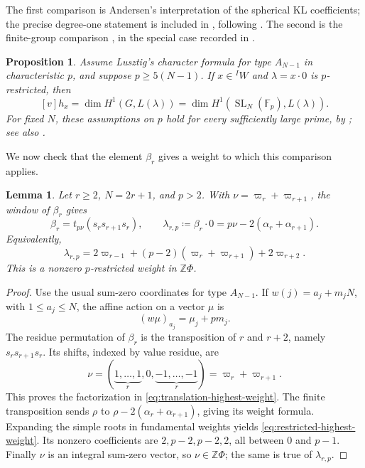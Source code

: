 \documentclass[11pt,a4paper,reqno]{amsart}
\numberwithin{equation}{section}
\newtheorem{proposition}[theorem]{Proposition}
\newtheorem{lemma}[theorem]{Lemma}
\theoremstyle{definition}
\theoremstyle{remark}
\theoremstyle{plain}
\begin{document}
The first comparison is Andersen's interpretation of the spherical
KL coefficients; the precise degree-one statement is included in
\cite[Theorem~4.5]{Luebeck}, following \cite{Andersen}.
The second is the finite-group comparison
\cite[Theorem~7.5]{BNPcompare}, in the special case recorded in
\cite[Theorem~4.6]{Luebeck}.

\begin{proposition}
\label{prop:cohomology-input}
Assume Lusztig's character formula for type $A_{N-1}$ in
characteristic $p$, and suppose $p\geq5(N-1)$.
If $x\in{}^I W$ and $\lambda=x\cdot0$ is $p$-restricted, then
\begin{equation}\label{eq:cohomology-comparison}
 [v]h_x
 =\dim H^1(G,L(\lambda))
 =\dim H^1(\operatorname{SL}_N(\mathbb F_p),L(\lambda)).
\end{equation}
For fixed $N$, these assumptions on $p$ hold for every sufficiently
large prime, by \cite{AJS,Fiebig}; see also
\cite[Theorem~3.1]{Luebeck}.
\end{proposition}

We now check that the element $\beta_r$ gives a weight to which this
comparison applies.

\begin{lemma}\label{lem:highest-weight}
Let $r\geq2$, $N=2r+1$, and $p>2$.
With $\nu=\varpi_r+\varpi_{r+1}$, the window of $\beta_r$ gives
\begin{equation}\label{eq:translation-highest-weight}
 \beta_r=t_{p\nu}(s_rs_{r+1}s_r),\qquad
 \lambda_{r,p}  \coloneqq  \beta_r\cdot0
 =p\nu-2(\alpha_r+\alpha_{r+1}).
\end{equation}
Equivalently,
\begin{equation}\label{eq:restricted-highest-weight}
 \lambda_{r,p} =2\varpi_{r-1}
 +(p-2)(\varpi_r+\varpi_{r+1})+2\varpi_{r+2}.
\end{equation}
This is a nonzero $p$-restricted weight in
$\mathbb Z\Phi$.
\end{lemma}
\begin{proof}
Use the usual sum-zero coordinates for type $A_{N-1}$.
If $w(j)=a_j+m_jN$, with $1\leq a_j\leq N$, the affine action
on a vector $\mu$ is
\[
 (w\mu)_{a_j}=\mu_j+pm_j.
\]
The residue permutation of $\beta_r$ is the transposition of $r$
and $r+2$, namely $s_rs_{r+1}s_r$.
Its shifts, indexed by value residue, are
\[
 \nu=(\underbrace{1,\ldots,1}_{r},0,
       \underbrace{-1,\ldots,-1}_{r})
 =\varpi_r+\varpi_{r+1}.
\]
This proves the factorization in
\eqref{eq:translation-highest-weight}.
The finite transposition sends $\rho$ to
$\rho-2(\alpha_r+\alpha_{r+1})$, giving its weight formula.
Expanding the simple roots in fundamental weights yields
\eqref{eq:restricted-highest-weight}.
Its nonzero coefficients are $2,p-2,p-2,2$, all between $0$
and $p-1$. Finally $\nu$ is an integral sum-zero vector, so
$\nu\in\mathbb Z\Phi$; the same is true of $\lambda_{r,p} $.
\end{proof}
\end{document}
